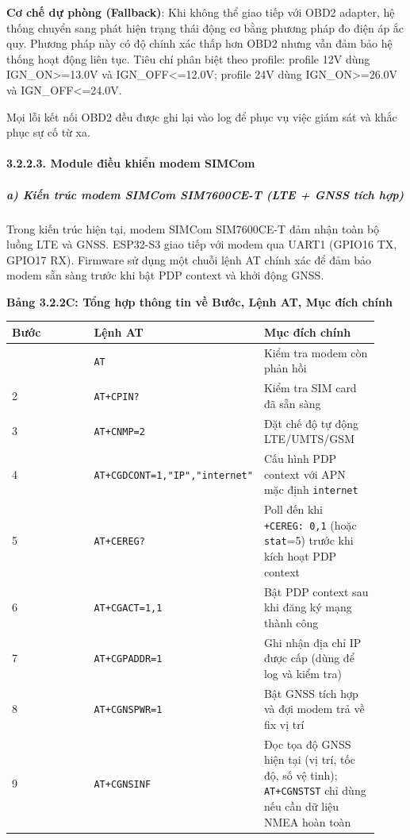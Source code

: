 \documentclass[13pt,a4paper]{extarticle}
\newcounter{none} %
\newcommand{\thesislongtableorignewline}{}
\let\thesislongtableorignewline\\
\renewcommand{\\}{\thesislongtableorignewline\hline}%
\let\\\thesislongtableorignewline
\newcommand{\thesistabletitle}[1]{%
  \begin{center}\textbf{#1}\end{center}%
}
\begin{document}
\textbf{Cơ chế dự phòng (Fallback)}: Khi không thể giao tiếp với OBD2
adapter, hệ thống chuyển sang phát hiện trạng thái động cơ bằng phương
pháp đo điện áp ắc quy. Phương pháp này có độ chính xác thấp hơn OBD2
nhưng vẫn đảm bảo hệ thống hoạt động liên tục. Tiêu chí phân biệt theo
profile: profile 12V dùng IGN\_ON\textgreater=13.0V và
IGN\_OFF\textless=12.0V; profile 24V dùng IGN\_ON\textgreater=26.0V và
IGN\_OFF\textless=24.0V.

Mọi lỗi kết nối OBD2 đều được ghi lại vào log để phục vụ việc giám sát
và khắc phục sự cố từ xa.

\paragraph{3.2.2.3. Module điều khiển modem
SIMCom}\label{3223-module-ux111iux1ec1u-khiux1ec3n-modem-simcom}

\subparagraph{a) Kiến trúc modem SIMCom SIM7600CE-T (LTE + GNSS tích
hợp)}\label{a-kiux1ebfn-truxfac-modem-simcom-sim7600ce-t-lte--gnss-tuxedch-hux1ee3p}

Trong kiến trúc hiện tại, modem SIMCom SIM7600CE-T đảm nhận toàn bộ
luồng LTE và GNSS. ESP32-S3 giao tiếp với modem qua UART1 (GPIO16 TX,
GPIO17 RX). Firmware sử dụng một chuỗi lệnh AT chính xác để đảm bảo
modem sẵn sàng trước khi bật PDP context và khởi động GNSS.

{\def\LTcaptype{none} %
\thesistabletitle{Bảng 3.2.2C: Tổng hợp thông tin về Bước, Lệnh AT, Mục đích chính}

\begin{longtable}{|p{0.30\linewidth}|p{0.28\linewidth}|p{0.34\linewidth}|}
\hline \textbf{Bước} & \textbf{Lệnh AT} & \textbf{Mục đích chính} \\
\hline
\endhead
\hline
\endlastfoot
1 & \texttt{AT} & Kiểm tra modem còn phản hồi \\
2 & \texttt{AT+CPIN?} & Kiểm tra SIM card đã sẵn sàng \\
3 & \texttt{AT+CNMP=2} & Đặt chế độ tự động LTE/UMTS/GSM \\
4 & \texttt{AT+CGDCONT=1,"IP","internet"} & Cấu hình PDP context với APN
mặc định \texttt{internet} \\
5 & \texttt{AT+CEREG?} & Poll đến khi \texttt{+CEREG:\ 0,1} (hoặc
\texttt{stat}=5) trước khi kích hoạt PDP context \\
6 & \texttt{AT+CGACT=1,1} & Bật PDP context sau khi đăng ký mạng thành
công \\
7 & \texttt{AT+CGPADDR=1} & Ghi nhận địa chỉ IP được cấp (dùng để log và
kiểm tra) \\
8 & \texttt{AT+CGNSPWR=1} & Bật GNSS tích hợp và đợi modem trả về fix vị
trí \\
9 & \texttt{AT+CGNSINF} & Đọc tọa độ GNSS hiện tại (vị trí, tốc độ, số
vệ tinh); \texttt{AT+CGNSTST} chỉ dùng nếu cần dữ liệu NMEA hoàn toàn \\
\end{longtable}
}
\end{document}
